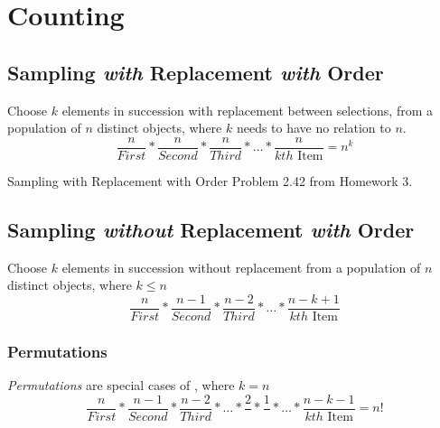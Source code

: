 \section{Counting} \label{sec:Counting}
	\subsection{Sampling \emph{with} Replacement \emph{with} Order} \label{subsec:Ordered Sampling with Replacement}
		\begin{definition} \label{def:Ordered Sampling with Replacement}
			Choose $k$ elements in succession with replacement between selections, from a population of $n$ distinct objects, where $k$ needs to have no relation to $n$.
			\begin{equation} \label{eq:Ordered Sampling with Replacement}
				\frac{n}{First} * \frac{n}{Second} * \frac{n}{Third} * \ldots * \frac{n}{kth \text{ Item}} = n^{k}
			\end{equation}
		\end{definition}
		\begin{example}[Problem 2.42]{Sampling with Replacement with Order}
			Problem 2.42 from Homework 3.
		\end{example}
	
	\subsection{Sampling \emph{without} Replacement \emph{with} Order} \label{subsec:Ordered Sampling without Replacement}
		\begin{definition} \label{def:Ordered Sampling without Replacement}
			Choose $k$ elements in succession without replacement from a population of $n$ distinct objects, where $k \leq n$
			\begin{equation} \label{eq:Ordered Sampling without Replacement}
				\frac{n}{First} * \frac{n-1}{Second} * \frac{n-2}{Third} * \ldots * \frac{n-k+1}{kth \text{ Item}}
			\end{equation}
		\end{definition}
		
		\subsubsection{Permutations} \label{subsubsec:Permutations}
			\begin{definition}[Permutation] \label{def:Permutation}
				\emph{Permutations} are special cases of , where $k = n$
				\begin{equation} \label{eq:Permutation}
					\frac{n}{First} * \frac{n-1}{Second} * \frac{n-2}{Third} * \ldots * \frac{2}{} * \frac{1}{} * \ldots * \frac{n-k-1}{kth \text{ Item}} = n!
				\end{equation}
			\end{definition}
		
